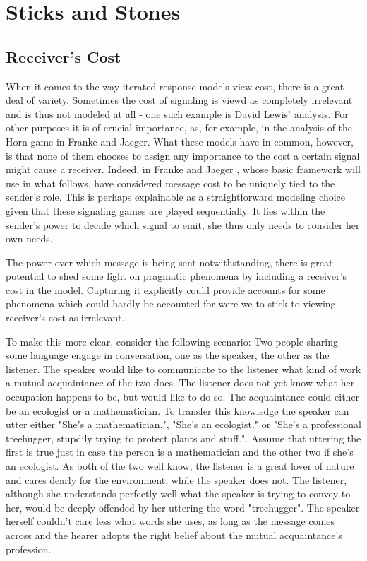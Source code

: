 \documentclass{article}
\begin{document}
\section{Sticks and Stones}
\subsection{Receiver's Cost}
When it comes to the way iterated response models view cost, there is a great deal of variety. Sometimes the cost of signaling is viewd as completely irrelevant and is thus not modeled at all - one such example is David Lewis' analysis.  For other purposes it is of crucial importance, as, for example, in the analysis of the Horn game in Franke and Jaeger. What these models have in common, however, is that none of them chooses to assign any importance to the cost a certain signal might cause a receiver. Indeed,  in Franke and Jaeger , whose basic framework will use in what follows, have considered message cost to be uniquely tied to the sender's role. This is perhaps explainable as a straightforward modeling choice given that these signaling games are played sequentially. It lies within the sender's power to decide which signal to emit, she thus only needs to consider her own needs. %

The power over which message is being sent notwithstanding, there is great potential to shed some light on pragmatic phenomena by including a receiver's cost in the model. Capturing it explicitly could provide accounts for some phenomena which could hardly be accounted for were we to stick to viewing receiver's cost as irrelevant.

To make this more clear, consider the following scenario: Two people sharing some language engage in conversation, one as the speaker, the other as the listener. The speaker would like to communicate to the listener what kind of work a mutual acquaintance of the two does. The listener does not yet know what her occupation happens to be, but would like to do so. The acquaintance could either be an ecologist or a mathematician. To transfer this knowledge the speaker can utter either "She's a mathematician.", "She's an ecologist." or "She's a professional treehugger, stupdily trying to protect plants and stuff.". Assume that uttering the first is true just in case the person is a mathematician and the other two if she's an ecologist. As both of the two well know, the listener is a great lover of nature and cares dearly for the environment, while the speaker does not. The listener, although she understands perfectly well what the speaker is trying to convey to her, would be deeply offended by her uttering the word "treehugger". The speaker herself couldn't care less what words she uses, as long as the message comes across and the hearer adopts the right belief about the mutual acquaintance's profession.
\end{document}
